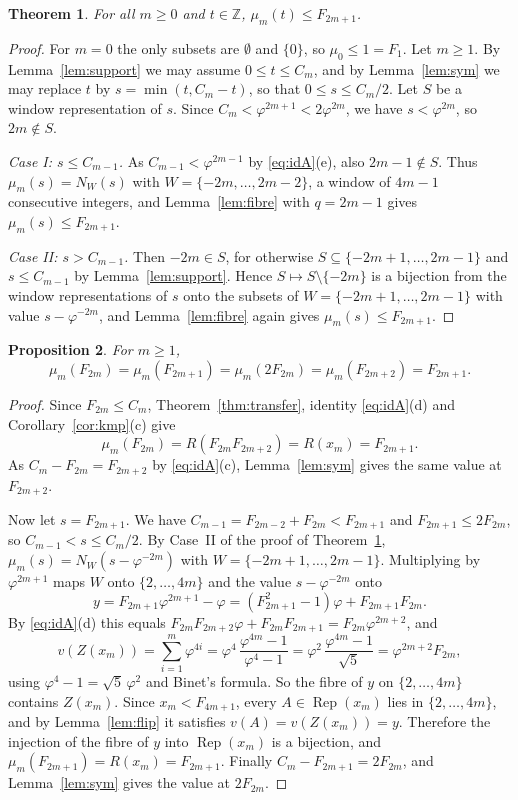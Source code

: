 \documentclass[11pt]{amsart}
\newtheorem{theorem}{Theorem}[section]
\newtheorem{proposition}[theorem]{Proposition}
\theoremstyle{definition}
\theoremstyle{remark}
\numberwithin{equation}{section}
\newcommand{\Z}{\mathbb{Z}}
\newcommand{\val}{v}
\newcommand{\Rep}{\operatorname{Rep}}
\begin{document}
\begin{theorem}\label{thm:upper}
For all $m\ge0$ and $t\in\Z$, $\mu_m(t)\le F_{2m+1}$.
\end{theorem}

\begin{proof}
For $m=0$ the only subsets are $\emptyset$ and $\{0\}$, so $\mu_0\le1=F_1$. Let $m\ge1$. By
Lemma~\ref{lem:support} we may assume $0\le t\le C_m$, and by Lemma~\ref{lem:sym} we may replace $t$
by $s=\min(t,C_m-t)$, so that $0\le s\le C_m/2$. Let $S$ be a window representation of $s$. Since
$C_m<\varphi^{2m+1}<2\varphi^{2m}$, we have $s<\varphi^{2m}$, so $2m\notin S$.

\emph{Case I: $s\le C_{m-1}$.} As $C_{m-1}<\varphi^{2m-1}$ by \eqref{eq:idA}(e), also $2m-1\notin S$.
Thus $\mu_m(s)=N_W(s)$ with $W=\{-2m,\dots,2m-2\}$, a window of $4m-1$ consecutive integers, and
Lemma~\ref{lem:fibre} with $q=2m-1$ gives $\mu_m(s)\le F_{2m+1}$.

\emph{Case II: $s>C_{m-1}$.} Then $-2m\in S$, for otherwise $S\subseteq\{-2m+1,\dots,2m-1\}$ and
$s\le C_{m-1}$ by Lemma~\ref{lem:support}. Hence $S\mapsto S\setminus\{-2m\}$ is a bijection from the
window representations of $s$ onto the subsets of $W=\{-2m+1,\dots,2m-1\}$ with value
$s-\varphi^{-2m}$, and Lemma~\ref{lem:fibre} again gives $\mu_m(s)\le F_{2m+1}$.
\end{proof}

\begin{proposition}\label{prop:attain}
For $m\ge1$,
\[
  \mu_m(F_{2m})=\mu_m(F_{2m+1})=\mu_m(2F_{2m})=\mu_m(F_{2m+2})=F_{2m+1}.
\]
\end{proposition}

\begin{proof}
Since $F_{2m}\le C_m$, Theorem~\ref{thm:transfer}, identity \eqref{eq:idA}(d) and
Corollary~\ref{cor:kmp}(c) give
\[
  \mu_m(F_{2m})=R(F_{2m}F_{2m+2})=R(x_m)=F_{2m+1}.
\]
As $C_m-F_{2m}=F_{2m+2}$ by \eqref{eq:idA}(c), Lemma~\ref{lem:sym} gives the same value at
$F_{2m+2}$.

Now let $s=F_{2m+1}$. We have $C_{m-1}=F_{2m-2}+F_{2m}<F_{2m+1}$ and $F_{2m+1}\le2F_{2m}$, so
$C_{m-1}<s\le C_m/2$. By Case~II of the proof of Theorem~\ref{thm:upper}, $\mu_m(s)=N_W(s-\varphi^{-2m})$
with $W=\{-2m+1,\dots,2m-1\}$. Multiplying by $\varphi^{2m+1}$ maps $W$ onto $\{2,\dots,4m\}$ and the
value $s-\varphi^{-2m}$ onto
\[
  y=F_{2m+1}\varphi^{2m+1}-\varphi=(F_{2m+1}^2-1)\varphi+F_{2m+1}F_{2m}.
\]
By \eqref{eq:idA}(d) this equals $F_{2m}F_{2m+2}\varphi+F_{2m}F_{2m+1}=F_{2m}\varphi^{2m+2}$, and
\[
  \val(Z(x_m))=\sum_{i=1}^{m}\varphi^{4i}=\varphi^4\,\frac{\varphi^{4m}-1}{\varphi^4-1}
  =\varphi^{2}\,\frac{\varphi^{4m}-1}{\sqrt5}=\varphi^{2m+2}F_{2m},
\]
using $\varphi^4-1=\sqrt5\,\varphi^2$ and Binet's formula. So the fibre of $y$ on $\{2,\dots,4m\}$
contains $Z(x_m)$. Since $x_m<F_{4m+1}$, every $A\in\Rep(x_m)$ lies in $\{2,\dots,4m\}$, and by
Lemma~\ref{lem:flip} it satisfies $\val(A)=\val(Z(x_m))=y$. Therefore the injection of the fibre of
$y$ into $\Rep(x_m)$ is a bijection, and $\mu_m(F_{2m+1})=R(x_m)=F_{2m+1}$. Finally
$C_m-F_{2m+1}=2F_{2m}$, and Lemma~\ref{lem:sym} gives the value at $2F_{2m}$.
\end{proof}
\end{document}
